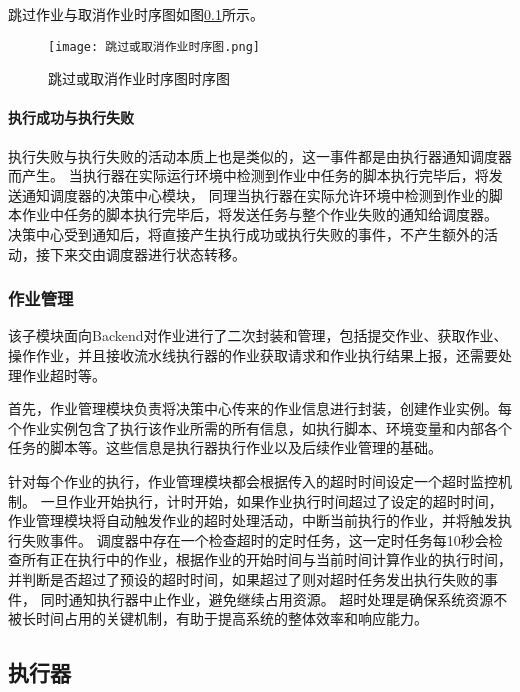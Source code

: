 跳过作业与取消作业时序图如图\ref{}所示。

\begin{figure}[h]
  \centering
  \texttt{[image: 跳过或取消作业时序图.png]}
  \caption{跳过或取消作业时序图时序图}
  \label{fig:跳过或取消作业时序图}
\end{figure}

\paragraph{执行成功与执行失败}
执行失败与执行失败的活动本质上也是类似的，这一事件都是由执行器通知调度器而产生。
当执行器在实际运行环境中检测到作业中任务的脚本执行完毕后，将发送通知调度器的决策中心模块，
同理当执行器在实际允许环境中检测到作业的脚本作业中任务的脚本执行完毕后，将发送任务与整个作业失败的通知给调度器。
决策中心受到通知后，将直接产生执行成功或执行失败的事件，不产生额外的活动，接下来交由调度器进行状态转移。

\subsubsection{作业管理}
该子模块面向Backend对作业进行了二次封装和管理，包括提交作业、获取作业、操作作业，并且接收流水线执行器的作业获取请求和作业执行结果上报，还需要处理作业超时等。

首先，作业管理模块负责将决策中心传来的作业信息进行封装，创建作业实例。每个作业实例包含了执行该作业所需的所有信息，如执行脚本、环境变量和内部各个任务的脚本等。这些信息是执行器执行作业以及后续作业管理的基础。

针对每个作业的执行，作业管理模块都会根据传入的超时时间设定一个超时监控机制。
一旦作业开始执行，计时开始，如果作业执行时间超过了设定的超时时间，作业管理模块将自动触发作业的超时处理活动，中断当前执行的作业，并将触发执行失败事件。
调度器中存在一个检查超时的定时任务，这一定时任务每10秒会检查所有正在执行中的作业，根据作业的开始时间与当前时间计算作业的执行时间，并判断是否超过了预设的超时时间，如果超过了则对超时任务发出执行失败的事件，
同时通知执行器中止作业，避免继续占用资源。
超时处理是确保系统资源不被长时间占用的关键机制，有助于提高系统的整体效率和响应能力。

\subsection{执行器}

